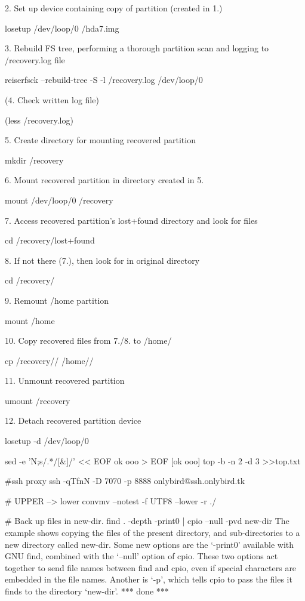 {2. Set up device containing copy of partition (created in 1.)

        losetup /dev/loop/0 /hda7.img

3. Rebuild FS tree, performing a thorough partition scan and logging to /recovery.log file

        reiserfsck --rebuild-tree -S -l /recovery.log /dev/loop/0

(4. Check written log file)

        (less /recovery.log)

5. Create directory for mounting recovered partition

        mkdir /recovery

6. Mount recovered partition in directory created in 5.

        mount /dev/loop/0 /recovery

7. Access recovered partition's lost+found directory and look for files

        cd /recovery/lost+found

8. If not there (7.), then look for in original directory

        cd /recovery/

9. Remount /home partition

        mount /home

10. Copy recovered files from 7./8. to /home/

        cp /recovery// /home//

11. Unmount recovered partition

        umount /recovery

12. Detach recovered partition device

        losetup -d /dev/loop/0

sed -e 'N;s/.*/[&]/' << EOF
ok
ooo
> EOF
[ok
ooo]
top -b -n 2 -d 3 >>top.txt

#ssh proxy
ssh -qTfnN -D 7070 -p 8888 onlybird@ssh.onlybird.tk

# UPPER --> lower
convmv --notest -f UTF8 --lower -r ./

# Back up files in new-dir.
find . -depth -print0 | cpio --null -pvd new-dir
The example shows copying the files of the present directory, and
sub-directories to a new directory called new-dir.  Some new options are
the `-print0' available with GNU find, combined with the `--null'
option of cpio.  These two options act together to send file names
between find and cpio, even if special characters are embedded in the
file names.  Another is `-p', which tells cpio to pass the files it
finds to the directory `new-dir'.
*** done ***

}
